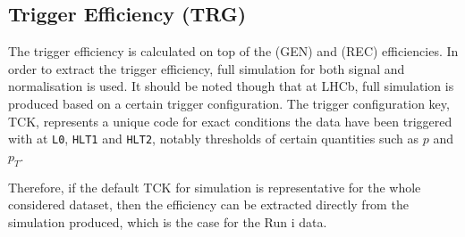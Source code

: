 %
%		


\subsection{Trigger Efficiency (TRG)}
\label{trigef}
 The trigger efficiency is calculated on top of the (GEN) and (REC) efficiencies. In order to extract the trigger efficiency, full simulation for both signal and normalisation is used. It should be noted though that at \gls{LHCb}, full simulation is produced based on a certain trigger configuration. The trigger configuration key, TCK, represents a unique code for exact conditions the data have been triggered with at \texttt{L0}, \texttt{HLT1} and \texttt{HLT2}, notably thresholds of certain quantities such as $p$ and $p_{T}$. 
 
Therefore, if the default TCK for simulation is representative for the whole considered dataset, then the efficiency can be extracted directly from the simulation produced, which is the case for the Run \Rn{1} data.

